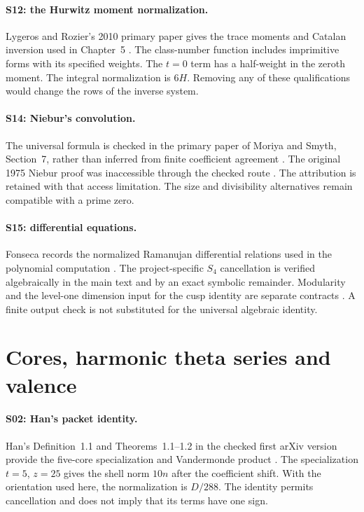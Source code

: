 \paragraph{S12: the Hurwitz moment normalization.}
Lygeros and Rozier's 2010 primary paper gives the trace moments and Catalan inversion used in Chapter~5 \cite{LRTrace}. The class-number function includes imprimitive forms with its specified weights. The $t=0$ term has a half-weight in the zeroth moment. The integral normalization is $6H$. Removing any of these qualifications would change the rows of the inverse system.

\paragraph{S14: Niebur's convolution.}
The universal formula is checked in the primary paper of Moriya and Smyth, Section~7, rather than inferred from finite coefficient agreement \cite{MoriyaSmyth}. The original 1975 Niebur proof was inaccessible through the checked route \cite{Niebur}. The attribution is retained with that access limitation. The size and divisibility alternatives remain compatible with a prime zero.

\paragraph{S15: differential equations.}
Fonseca records the normalized Ramanujan differential relations used in the polynomial computation \cite{Fonseca}. The project-specific $S_4$ cancellation is verified algebraically in the main text and by an exact symbolic remainder. Modularity and the level-one dimension input for the cusp identity are separate contracts \cite{Stein}. A finite output check is not substituted for the universal algebraic identity.

\section{Cores, harmonic theta series and valence}
\paragraph{S02: Han's packet identity.}
Han's Definition~1.1 and Theorems~1.1--1.2 in the checked first arXiv version provide the five-core specialization and Vandermonde product \cite{Han}. The specialization $t=5$, $z=25$ gives the shell norm $10n$ after the coefficient shift. With the orientation used here, the normalization is $D/288$. The identity permits cancellation and does not imply that its terms have one sign.

